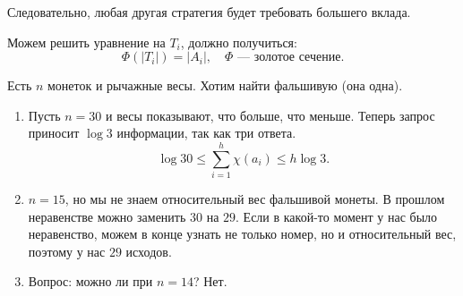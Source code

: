Следовательно, любая другая стратегия будет требовать большего вклада.

Можем решить уравнение на $ T_i$, должно получиться:
 \[
	 \Phi(\lvert T_i \rvert ) = \lvert A_i \rvert, \quad \Phi \text{ --- золотое сечение} 
.\] 

\begin{prac}
	Есть $ n$ монеток и рычажные весы. Хотим найти фальшивую (она одна). 
\begin{enumerate}
    \item Пусть $ n = 30$ и весы показывают, что больше, что меньше. Теперь запрос приносит $  \log 3$ информации, так как три ответа.
		\[
			\log 30 \le  \sum_{i=1}^{h} \chi(a_i) \le h \log 3 
		.\] 
	\item $ n = 15$, но мы не знаем относительный вес фальшивой монеты. В прошлом неравенстве можно заменить  $ 30$ на $ 29$. Если в какой-то момент у нас было неравенство, можем в конце узнать не только номер, но и относительный вес, поэтому у нас $ 29$ исходов.
	\item Вопрос: можно ли при $ n=14$?  Нет. 
\end{enumerate} 
\end{prac}

